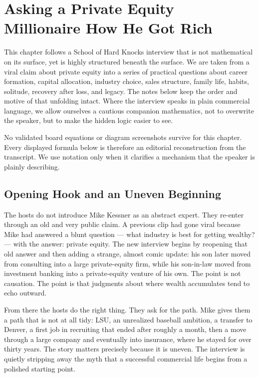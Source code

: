 \chapter{Asking a Private Equity Millionaire How He Got Rich}

This chapter follows a School of Hard Knocks interview that is not mathematical on its surface, yet is highly structured beneath the surface. We are taken from a viral claim about private equity into a series of practical questions about career formation, capital allocation, industry choice, sales structure, family life, habits, solitude, recovery after loss, and legacy. The notes below keep the order and motive of that unfolding intact. Where the interview speaks in plain commercial language, we allow ourselves a cautious companion mathematics, not to overwrite the speaker, but to make the hidden logic easier to see.

\begin{remark}
No validated board equations or diagram screenshots survive for this chapter. Every displayed formula below is therefore an editorial reconstruction from the transcript. We use notation only when it clarifies a mechanism that the speaker is plainly describing.
\end{remark}

\section{Opening Hook and an Uneven Beginning}

The hosts do not introduce Mike Kessner as an abstract expert. They re-enter through an old and very public claim. A previous clip had gone viral because Mike had answered a blunt question --- what industry is best for getting wealthy? --- with the answer: private equity. The new interview begins by reopening that old answer and then adding a strange, almost comic update: his son later moved from consulting into a large private-equity firm, while his son-in-law moved from investment banking into a private-equity venture of his own. The point is not causation. The point is that judgments about where wealth accumulates tend to echo outward.

From there the hosts do the right thing. They ask for the path. Mike gives them a path that is not at all tidy: LSU, an unrealized baseball ambition, a transfer to Denver, a first job in recruiting that ended after roughly a month, then a move through a large company and eventually into insurance, where he stayed for over thirty years. The story matters precisely because it is uneven. The interview is quietly stripping away the myth that a successful commercial life begins from a polished starting point.

